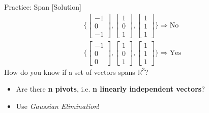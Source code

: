 \begin{frame}{Practice: Span [Solution]}
    \begin{align*}
        \bigg\{
            \begin{bmatrix} -1 \\ 0 \\ -1 \end{bmatrix},
            \begin{bmatrix} 1 \\ 0 \\ 1 \end{bmatrix},
            \begin{bmatrix} 1 \\ 1 \\ 1 \end{bmatrix} 
        \bigg\} \Longrightarrow \text{No}\\
        \bigg\{
            \begin{bmatrix} -1 \\ 0 \\ 0 \end{bmatrix},
            \begin{bmatrix} 1 \\ 0 \\ 1 \end{bmatrix},
            \begin{bmatrix} 1 \\ 1 \\ 1 \end{bmatrix} 
        \bigg\} \Longrightarrow \text{Yes}
    \end{align*}
    How do you know if a set of vectors spans $\mathbb{R}^3$?
    \begin{itemize}
        \item Are there \textbf{n pivots}, i.e. \textbf{n linearly independent vectors}?
        \item Use \textit{Gaussian Elimination}!
    \end{itemize}
\end{frame}

